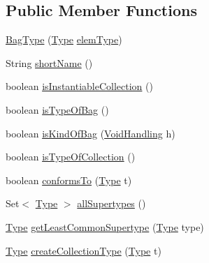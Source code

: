 \subsection*{Public Member Functions}
\begin{DoxyCompactItemize}
\item 
\hyperlink{classorg_1_1tzi_1_1use_1_1uml_1_1ocl_1_1type_1_1_bag_type_abf0cafe834580ab0813af4397f04b0a6}{Bag\-Type} (\hyperlink{interfaceorg_1_1tzi_1_1use_1_1uml_1_1ocl_1_1type_1_1_type}{Type} \hyperlink{classorg_1_1tzi_1_1use_1_1uml_1_1ocl_1_1type_1_1_collection_type_a51cda1902aa2b4a9be4a40fa9b5b7aab}{elem\-Type})
\item 
String \hyperlink{classorg_1_1tzi_1_1use_1_1uml_1_1ocl_1_1type_1_1_bag_type_a1cb212c7260092a7af5a5e9b321b28bd}{short\-Name} ()
\item 
boolean \hyperlink{classorg_1_1tzi_1_1use_1_1uml_1_1ocl_1_1type_1_1_bag_type_adf5a158dedb67bd2c0f01c515aaeffab}{is\-Instantiable\-Collection} ()
\item 
boolean \hyperlink{classorg_1_1tzi_1_1use_1_1uml_1_1ocl_1_1type_1_1_bag_type_ab58bf45d057a9608ba0296b1cadb0671}{is\-Type\-Of\-Bag} ()
\item 
boolean \hyperlink{classorg_1_1tzi_1_1use_1_1uml_1_1ocl_1_1type_1_1_bag_type_a7363beb54e2e17bae9bbe3eb65986a0e}{is\-Kind\-Of\-Bag} (\hyperlink{enumorg_1_1tzi_1_1use_1_1uml_1_1ocl_1_1type_1_1_type_1_1_void_handling}{Void\-Handling} h)
\item 
boolean \hyperlink{classorg_1_1tzi_1_1use_1_1uml_1_1ocl_1_1type_1_1_bag_type_a358a641c2dd4adbdcff313afc7e37d51}{is\-Type\-Of\-Collection} ()
\item 
boolean \hyperlink{classorg_1_1tzi_1_1use_1_1uml_1_1ocl_1_1type_1_1_bag_type_a10fd17b52ec4c20b015ebace3e3cb9b0}{conforms\-To} (\hyperlink{interfaceorg_1_1tzi_1_1use_1_1uml_1_1ocl_1_1type_1_1_type}{Type} t)
\item 
Set$<$ \hyperlink{interfaceorg_1_1tzi_1_1use_1_1uml_1_1ocl_1_1type_1_1_type}{Type} $>$ \hyperlink{classorg_1_1tzi_1_1use_1_1uml_1_1ocl_1_1type_1_1_bag_type_a365ff483a5611dbfeae7025ab4728220}{all\-Supertypes} ()
\item 
\hyperlink{interfaceorg_1_1tzi_1_1use_1_1uml_1_1ocl_1_1type_1_1_type}{Type} \hyperlink{classorg_1_1tzi_1_1use_1_1uml_1_1ocl_1_1type_1_1_bag_type_ad220d637ffb25f7f0019cf0d30d252e0}{get\-Least\-Common\-Supertype} (\hyperlink{interfaceorg_1_1tzi_1_1use_1_1uml_1_1ocl_1_1type_1_1_type}{Type} type)
\item 
\hyperlink{interfaceorg_1_1tzi_1_1use_1_1uml_1_1ocl_1_1type_1_1_type}{Type} \hyperlink{classorg_1_1tzi_1_1use_1_1uml_1_1ocl_1_1type_1_1_bag_type_a9bfddcc41d24cefbf8234bbb2a5fc2a1}{create\-Collection\-Type} (\hyperlink{interfaceorg_1_1tzi_1_1use_1_1uml_1_1ocl_1_1type_1_1_type}{Type} t)

\end{DoxyCompactItemize}
